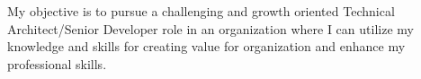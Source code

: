 %
%
%
\par{
My objective is to pursue a challenging and growth oriented Technical Architect/Senior Developer role in an organization where I can utilize
my knowledge and skills for creating value for organization and enhance my professional skills.
}